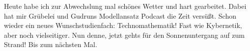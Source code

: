 Heute habe ich zur Abwechslung mal schönes Wetter und hart gearbeitet.
Dabei hat mir Grübelei und Gudruns Modellansatz Podcast die Zeit
versüßt. Schon wieder ein neues Wunschstudienfach: Technomathematik!
Fast wie Kybernetik, aber noch vielseitiger.  Nun denne, jetzt gehts
für den Sonnenuntergang auf zum Strand! Bis zum nächsten Mal.
